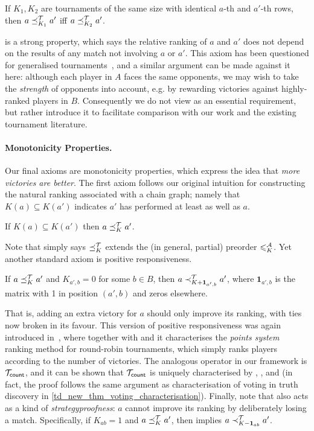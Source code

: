 \begin{axiom}[\iim{}]
    If $K_1, K_2$ are tournaments of the same size with identical $a$-th and
    $a'$-th rows, then $a \preceq_{K_1}^{\mathcal{T}} a'$ iff $a \preceq_{K_2}^{\mathcal{T}} a'$.

\end{axiom}

\iim{} is a strong property, which says the relative ranking of $a$ and
$a'$ does not depend on the results of any match not involving $a$ or $a'$.
This axiom has been questioned for generalised
tournaments~\cite{gonzalez2014paired}, and a similar argument can be made
against it here: although each player in $A$ faces the same opponents, we may
wish to take the \emph{strength} of opponents into account, e.g. by rewarding
victories against highly-ranked players in $B$. Consequently we do not view
\iim{} as an essential requirement, but rather introduce it to
facilitate comparison with our work and the existing tournament literature.

\paragraph{Monotonicity Properties.}
%
Our final axioms are monotonicity properties, which express the idea that
\emph{more victories are better}. The first axiom follows our original
intuition for constructing the natural ranking associated with a chain graph;
namely that $K(a) \subseteq K(a')$ indicates $a'$ has performed at least as
well as $a$.

\begin{axiom}[\mon{}]
    If $K(a) \subseteq K(a')$ then $a \preceq_K^{\mathcal{T}} a'$.
\end{axiom}

Note that \mon{} simply says ${\preceq_K^{\mathcal{T}}}$ extends the (in general,
partial) preorder ${\leqslant^{\mathcal{A}}_K}$.
%
Yet another standard axiom is positive responsiveness.

\begin{axiom}[\posresp{}]
    If $a \preceq_K^{\mathcal{T}} a'$ and $K_{a',b} = 0$ for some $b \in B$, then $a
    \prec_{K + \bm{1}_{a', b}}^{\mathcal{T}} a'$, where $\bm{1}_{a', b}$ is the matrix
    with 1 in position $(a', b)$ and zeros elsewhere.

\end{axiom}

That is, adding an extra victory for $a$ should only improve its ranking, with
ties now broken in its favour. This version of positive responsiveness was
again introduced in~\cite{rubinstein1980ranking}, where together with
\anon{} and \iim{} it characterises the \emph{points system}
ranking method for round-robin tournaments, which simply ranks players
according to the number of victories. The analogous operator in our framework
is ${\mathcal{T}_{\mathsf{count}}}$, and it can be shown that ${\mathcal{T}_{\mathsf{count}}}$ is uniquely characterised
by \anon{}, \iim{}, \posresp{} and \dualaxiom{} (in fact, the proof follows the
same argument as characterisation of voting in truth discovery in
\cref{td_new_thm_voting_characterisation}).
%
Finally, note that \posresp{} also acts as a kind of
\emph{strategyproofness}: $a$ cannot improve its ranking by deliberately losing
a match. Specifically, if $K_{ab} = 1$ and $a \preceq_K^{\mathcal{T}} a'$, then
\posresp{} implies $a \prec_{K - \bm{1}_{ab}}^{\mathcal{T}} a'$.

